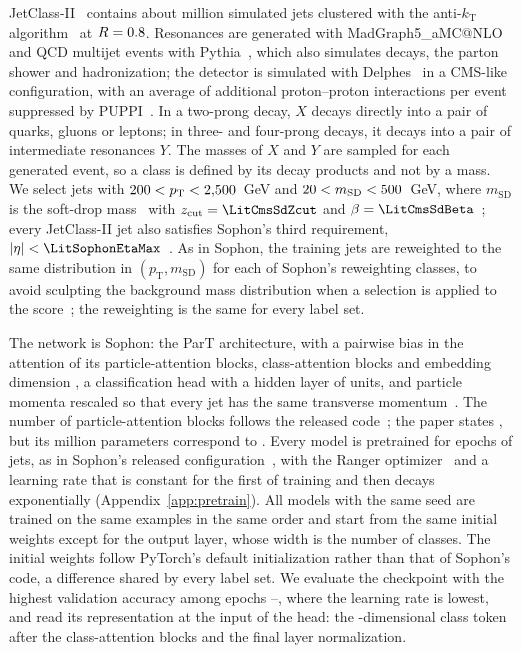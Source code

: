 \documentclass[11pt]{article}
\begin{document}
JetClass-II~\cite{sophon,jetclasstwo} contains about \LitJetClassTwoNJetsMillion{} million simulated
jets clustered with the anti-$k_{\mathrm T}$ algorithm~\cite{antikt} at $R =
0.8$. Resonances are generated with MadGraph5\_aMC@NLO~\cite{madgraph} and QCD
multijet events with Pythia~\cite{pythia}, which also simulates decays, the parton shower and
hadronization; the detector is simulated with Delphes~\cite{delphes} in a CMS-like configuration,
with an average of \LitJetClassTwoPileupMean{} additional proton--proton interactions per event
suppressed by PUPPI~\cite{puppi}. In a two-prong decay, $X$ decays directly into a pair of quarks,
gluons or leptons; in three- and four-prong decays, it decays into a pair of intermediate resonances
$Y$. The masses of $X$ and $Y$ are sampled for each generated event, so a class is defined by its
decay products and not by a mass. We select jets with $200 < p_{\mathrm T} < 2{,}500$~GeV
and $20 < m_{\mathrm{SD}} < 500$~GeV, where $m_{\mathrm{SD}}$ is the soft-drop
mass~\cite{softdrop} with $z_{\mathrm{cut}} = \LitCmsSdZcut$ and $\beta = \LitCmsSdBeta$~\cite{cmsmlid};
every JetClass-II jet also satisfies Sophon's third requirement, $|\eta| <
\LitSophonEtaMax$~\cite[App.~A]{sophon}. As in Sophon, the training jets are reweighted to the same
distribution in $(p_{\mathrm T}, m_{\mathrm{SD}})$ for each of Sophon's reweighting classes, to avoid
sculpting the background mass distribution when a selection is applied to the
score~\cite[Sec.~II]{sophon}; the reweighting is the same for every label set.

The network is Sophon: the ParT architecture, with a pairwise bias in the attention of its
\DesignParticleBlocks{} particle-attention blocks, \DesignClassBlocks{} class-attention blocks and
embedding dimension \DesignEmbedDim, a classification head with a hidden layer of
\DesignHeadHidden{} units, and particle momenta rescaled so that every jet has the same transverse
momentum~\cite[Sec.~II]{sophon}. The number of particle-attention blocks follows the released
code~\cite{sophoncode}; the paper states \LitSophonPaperParticleBlocks, but its \LitSophonParamsMillion{} million
parameters correspond to \LitSophonBlocksCode. Every
model is pretrained for \DesignEpochs{} epochs of \DesignSamplesPerEpoch{} jets, as in Sophon's
released configuration~\cite{sophoncode}, with the Ranger optimizer~\cite{lookahead,radam} and a
learning rate that is constant for the first \DesignLrFlatPercent{} of training and then decays
exponentially (Appendix~\ref{app:pretrain}). All models with the same seed are trained on the same
examples in the same order and start from the same initial weights except for the output layer,
whose width is the number of classes. The initial weights follow PyTorch's default initialization
rather than that of Sophon's code, a difference shared by every label set. We evaluate the
checkpoint with the highest validation accuracy among epochs
\DesignWavgFirstEpoch--\DesignWavgLastEpoch, where the learning rate is lowest, and read its
representation at the input of the head: the \DesignEmbedDim-dimensional class token after the
class-attention blocks and the final layer normalization.
\end{document}
